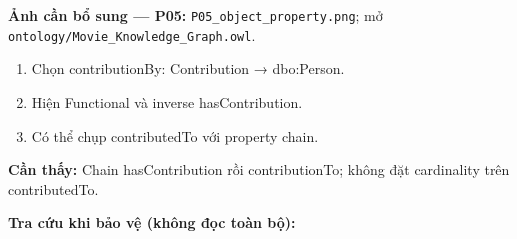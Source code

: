 \documentclass[
  11pt,
]{article}
\providecommand{\tightlist}{%
  \setlength{\itemsep}{0pt}\setlength{\parskip}{0pt}}
\begin{document}
\textbf{Ảnh cần bổ sung --- P05:}
\texttt{P05\_\allowbreak{}obje\allowbreak{}ct\_\allowbreak{}prope\allowbreak{}rty.\allowbreak{}png};
mở
\texttt{ontology\allowbreak{}/\allowbreak{}\allowbreak{}Movie\_\allowbreak{}\allowbreak{}K\allowbreak{}nowledge\allowbreak{}\_\allowbreak{}\allowbreak{}Graph.\allowbreak{}o\allowbreak{}wl}.

\begin{enumerate}
\def\labelenumi{\arabic{enumi}.}
\tightlist
\item
  Chọn contribu\allowbreak{}tion\allowbreak{}By:\allowbreak{}
  Contribution → dbo:Person.
\item
  Hiện Functional và inverse
  has\allowbreak{}Contr\allowbreak{}ibution.\allowbreak{}
\item
  Có thể chụp contribu\allowbreak{}ted\allowbreak{}To với property
  chain.
\end{enumerate}

\textbf{Cần thấy:} Chain has\allowbreak{}Contr\allowbreak{}ibution rồi
contribu\allowbreak{}tion\allowbreak{}To; không đặt cardinality trên
contribu\allowbreak{}ted\allowbreak{}To.\allowbreak{}

\textbf{Tra cứu khi bảo vệ (không đọc toàn bộ):}
\end{document}
